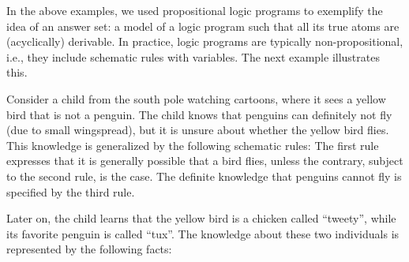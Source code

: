 In the above examples,
we used propositional logic programs to exemplify the idea
of an answer set: a model of a logic program such that all its true atoms are
(acyclically) derivable.
In practice, logic programs are typically non-propositional, i.e.,
they include schematic rules with variables.
The next example illustrates this.

\begin{example}\label{ex:flies}
Consider a child from the south pole watching cartoons,
where it sees a yellow bird that is not a penguin.
The child knows that penguins can definitely not fly (due to small wingspread),
but it is unsure about whether the yellow bird flies.
This knowledge is generalized by
the following schematic rules:
%
%
The first rule expresses that it is generally possible that a bird flies,
unless the contrary, subject to the second rule, is the case.
The definite knowledge that penguins cannot fly
is specified by the third rule.

Later on, the child learns that the yellow bird
is a chicken called ``tweety'',
while its favorite penguin is called ``tux''.
The knowledge about these two individuals is
represented by the following facts:



\end{example}
